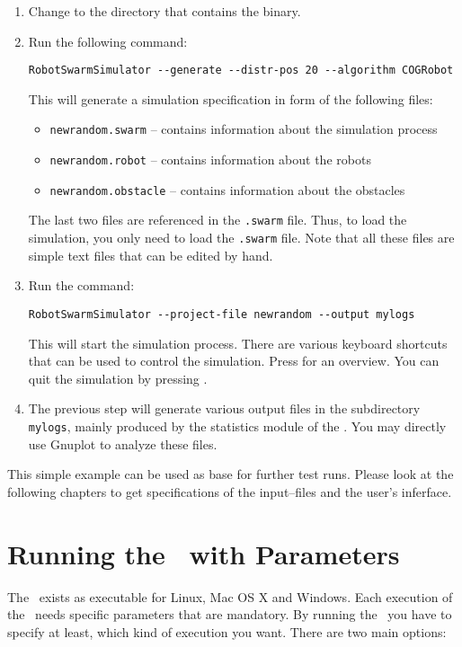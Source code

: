 \documentclass[a4paper,halfparskip,11pt,twoside]{scrartcl}
\begin{document}
\begin{enumerate}
	\item Change to the directory that contains the \RSS binary.
	\item Run the following command:

		\centerline{\tt RobotSwarmSimulator -{}-generate -{}-distr-pos 20 -{}-algorithm COGRobot}

		This will generate a simulation specification in form of the following files:
		\begin{itemize}
			\item {\tt newrandom.swarm} -- contains information about the simulation process
			\item {\tt newrandom.robot} -- contains information about the robots
			\item {\tt newrandom.obstacle} -- contains information about the obstacles
		\end{itemize}
		The last two files are referenced in the {\tt .swarm} file. Thus, to load the simulation, you only need to load the {\tt .swarm} file. Note that all these files
are simple text files that can be edited by hand.
	\item Run the command:

		\centerline{\tt RobotSwarmSimulator -{}-project-file newrandom -{}-output mylogs}

		This will start the simulation process. There are various keyboard shortcuts that can be used to control the simulation. Press  for an overview. You can quit the simulation by pressing .
	\item The previous step will generate various output files in the subdirectory {\tt mylogs}, mainly produced by the statistics module of the \RSS. You may directly use Gnuplot to analyze these files.
\end{enumerate}
This simple example can be used as base for further test runs. Please look at the following chapters to get specifications of the input--files and the user's inferface.

\section{Running the \RSS\ with Parameters}
The \RSS\ exists as executable for Linux, Mac OS X and Windows. Each execution of the \RSS\ needs specific parameters that are mandatory. By running the \RSS\ you have to specify at least, which kind of execution you want. There are two main options:
\end{document}
